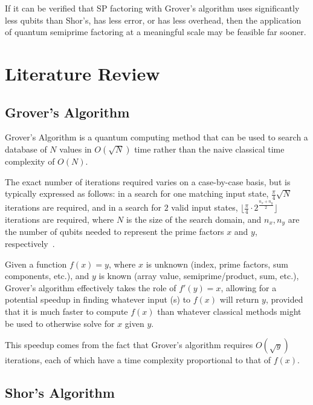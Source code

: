 \documentclass[twocolumn]{cinc}
\begin{document}
  If it can be verified that SP factoring with Grover's algorithm
  uses significantly less qubits than Shor's, has less error, or has less overhead,
  then the application of quantum semiprime factoring at a meaningful scale 
  may be feasible far sooner.

\section{Literature Review}

  \subsection{Grover's Algorithm}

  Grover's Algorithm is a quantum computing method 
  that can be used to search a database of $N$ values in $O(\sqrt{N})$ time 
  rather than the naive classical time complexity of $O(N)$\cite{grover}. 

  The exact number of iterations required varies on a case-by-case basis,
  but is typically expressed as follows: in a search for one matching input
  state, $\frac{\pi }{4}\sqrt{N}$ iterations are required, and in a search
  for $2$ valid input states, $\lfloor \frac{\pi }{4} \cdot 2^\frac{n_x + n_y}{2}\rfloor$
  iterations are required, where $N$ is the size of the search domain, and $n_x, n_y$ are
  the number of qubits needed to represent the prime factors $x$ and $y$, respectively~\cite{quantum_factoring}.

  
  Given a function $f(x)=y$, where $x$ is unknown (index, prime factors, 
  sum components, etc.), and $y$ is known (array value, semiprime/product, 
  sum, etc.), Grover's algorithm effectively takes the role of $f'(y)=x$, 
  allowing for a potential speedup in finding whatever input (s) to $f(x)$
  will return $y$, provided that it is much faster to compute $f(x)$ than
  whatever classical methods might be used to otherwise solve for $x$ given $y$.

  This speedup comes from the fact that Grover's algorithm requires 
  $O(\sqrt{y})$ iterations, each of which have a time complexity proportional
  to that of $f(x)$.

  \subsection{Shor's Algorithm}
\end{document}
